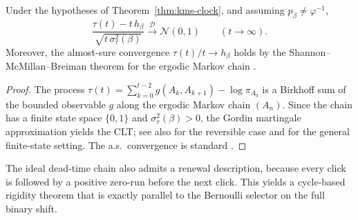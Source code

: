 \begin{theorem}\label{thm:clt-clock}
Under the hypotheses of Theorem~\ref{thm:kms-clock}, and assuming $p_\beta\neq\varphi^{-1}$,
\begin{equation}\label{eq:bridge-clt}
\frac{\tau(t)-t\,h_\beta}{\sqrt{t\,\sigma_\tau^2(\beta)}}
\xrightarrow{\;\mathcal D\;}
\mathcal N(0,1)
\qquad(t\to\infty).
\end{equation}
Moreover, the almost-sure convergence $\tau(t)/t\to h_\beta$ holds by the Shannon--McMillan--Breiman theorem for the ergodic Markov chain \cite{CoverThomas2006}.
\end{theorem}

\begin{proof}
The process $\tau(t)=\sum_{k=0}^{t-2}g(A_k,A_{k+1})-\log\pi_{A_0}$ is a Birkhoff sum of the bounded observable $g$ along the ergodic Markov chain $(A_n)$. Since the chain has a finite state space $\{0,1\}$ and $\sigma_\tau^2(\beta)>0$, the Gordin martingale approximation \cite{Gordin1969} yields the CLT; see also \cite{KipnisVaradhan1986} for the reversible case and \cite{Billingsley1995} for the general finite-state setting. The a.s.\ convergence is standard \cite{CoverThomas2006}.
\end{proof}

The ideal dead-time chain also admits a renewal description, because every click is followed by a positive zero-run before the next click. This yields a cycle-based rigidity theorem that is exactly parallel to the Bernoulli selector on the full binary shift.

